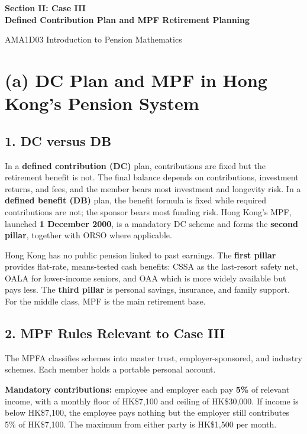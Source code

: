 \documentclass[12pt, letterpaper]{article}
\begin{document}
\begin{titlepage}
  \centering
  \vspace*{2cm}
  {\LARGE\bfseries Section II: Case III\\[0.4em]
  Defined Contribution Plan and MPF Retirement Planning\par}
  \vspace{1.5cm}
  {\large AMA1D03 Introduction to Pension Mathematics\par}
  \vfill
\end{titlepage}
\setcounter{page}{1}

\section*{(a) DC Plan and MPF in Hong Kong's Pension System}

\subsection*{1. DC versus DB}

In a \textbf{defined contribution (DC)} plan, contributions are fixed but the retirement benefit is not. The final balance depends on contributions, investment returns, and fees, and the member bears most investment and longevity risk. In a \textbf{defined benefit (DB)} plan, the benefit formula is fixed while required contributions are not; the sponsor bears most funding risk. Hong Kong's MPF, launched \textbf{1 December 2000}, is a mandatory DC scheme and forms the \textbf{second pillar}, together with ORSO where applicable.

Hong Kong has no public pension linked to past earnings. The \textbf{first pillar} provides flat-rate, means-tested cash benefits: CSSA as the last-resort safety net, OALA for lower-income seniors, and OAA which is more widely available but pays less. The \textbf{third pillar} is personal savings, insurance, and family support. For the middle class, MPF is the main retirement base.

\subsection*{2. MPF Rules Relevant to Case III}

The MPFA classifies schemes into master trust, employer-sponsored, and industry schemes. Each member holds a portable personal account.

\textbf{Mandatory contributions:} employee and employer each pay \textbf{5\%} of relevant income, with a monthly floor of HK\$7,100 and ceiling of HK\$30,000. If income is below HK\$7,100, the employee pays nothing but the employer still contributes 5\% of HK\$7,100. The maximum from either party is HK\$1,500 per month.
\end{document}
